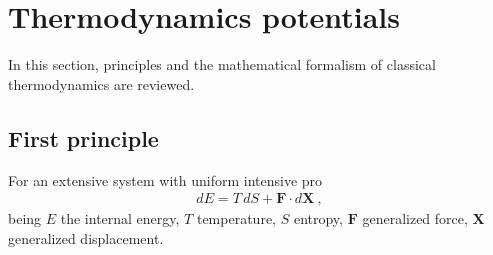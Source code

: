 \documentclass[letterpaper,10pt,english]{jupyterBook}
\begin{document}
\sphinxstepscope


\chapter{Thermodynamics potentials}
\label{\detokenize{ch/potentials:thermodynamics-potentials}}\label{\detokenize{ch/potentials:classical-thermodynamics-potentials}}\label{\detokenize{ch/potentials::doc}}
\sphinxAtStartPar
In this section, principles and the mathematical formalism of classical thermodynamics are reviewed.


\section{First principle}
\label{\detokenize{ch/potentials:first-principle}}\label{\detokenize{ch/potentials:classical-thermodynamics-potentials-first-principle}}
\sphinxAtStartPar
For an extensive system with uniform intensive pro
\begin{equation*}
\begin{split}d E = T \, d S + \mathbf{F} \cdot d \mathbf{X} \ ,\end{split}
\end{equation*}
\sphinxAtStartPar
being \(E\) the internal energy, \(T\) temperature, \(S\) entropy, \(\mathbf{F}\) generalized force, \(\mathbf{X}\) generalized displacement.
\end{document}

